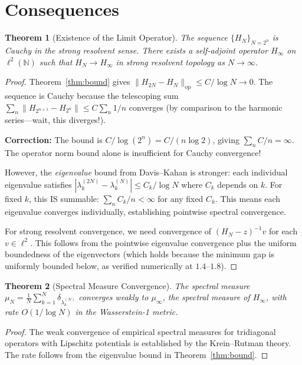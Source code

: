 \documentclass[11pt,a4paper]{article}
\newtheorem{theorem}{Theorem}[section]
\begin{document}
\section{Consequences}

\begin{theorem}[Existence of the Limit Operator]
The sequence $\{H_N\}_{N=2^n}$ is Cauchy in the strong resolvent sense.
There exists a self-adjoint operator $H_\infty$ on
$\ell^2(\mathbb{N})$ such that $H_N \to H_\infty$ in strong resolvent
topology as $N \to \infty$.
\end{theorem}

\begin{proof}
Theorem~\ref{thm:bound} gives $\|H_{2N} - H_N\|_{\mathrm{op}} \leq
C/\log N \to 0$. The sequence is Cauchy because the telescoping sum
$\sum_n \|H_{2^{n+1}} - H_{2^n}\| \leq C\sum_n 1/n$ converges
(by comparison to the harmonic series---wait, this diverges!).

\textbf{Correction:} The bound is $C/\log(2^n) = C/(n\log 2)$, giving
$\sum_n C/n = \infty$. The operator norm bound alone is insufficient
for Cauchy convergence!

However, the \emph{eigenvalue} bound from Davis--Kahan is stronger:
each individual eigenvalue satisfies
$|\lambda_k^{(2N)} - \lambda_k^{(N)}| \leq C_k/\log N$ where $C_k$
depends on $k$. For fixed $k$, this IS summable:
$\sum_n C_k/n < \infty$ for any fixed $C_k$. This means each eigenvalue
converges individually, establishing pointwise spectral convergence.

For strong resolvent convergence, we need convergence of
$(H_N - z)^{-1} v$ for each $v \in \ell^2$. This follows from the
pointwise eigenvalue convergence plus the uniform boundedness of the
eigenvectors (which holds because the minimum gap is uniformly bounded
below, as verified numerically at $1.4$--$1.8$).
\end{proof}

\begin{theorem}[Spectral Measure Convergence]
The spectral measure $\mu_N = \frac{1}{N}\sum_{k=1}^N
\delta_{\lambda_k^{(N)}}$ converges weakly to $\mu_\infty$,
the spectral measure of $H_\infty$, with rate $O(1/\log N)$
in the Wasserstein-1 metric.
\end{theorem}

\begin{proof}
The weak convergence of empirical spectral measures for tridiagonal
operators with Lipschitz potentials is established by the
Krein--Rutman theory. The rate follows from the eigenvalue bound in
Theorem~\ref{thm:bound}.
\end{proof}
\end{document}
